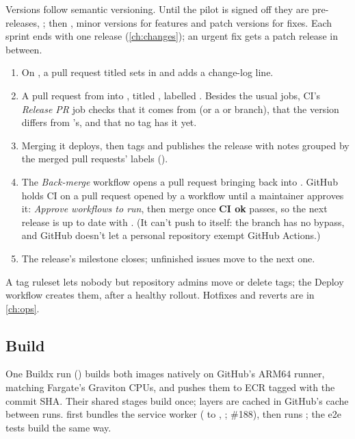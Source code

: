 Versions follow semantic versioning. Until the pilot is signed off they are pre-releases,
; then , minor versions for features and patch versions for
fixes. Each sprint ends with one release (\cref{ch:changes}); an urgent fix gets a patch release
in between.
\begin{enumerate}
  \item On , a pull request titled  sets  in
     and adds a change-log line.
  \item A pull request from  into , titled , labelled
    . Besides the usual jobs, CI's \emph{Release PR} job checks that it
    comes from  (or a  or  branch), that the version differs
    from 's, and that no tag has it yet.
  \item Merging it deploys, then tags  and publishes the release with notes grouped by
    the merged pull requests' labels ().
  \item The \emph{Back-merge} workflow opens a pull request bringing  back into
    . GitHub holds CI on a pull request opened by a workflow until a maintainer
    approves it: \emph{Approve workflows to run}, then merge once \textbf{CI ok} passes, so the
    next release is up to date with . (It can't push to  itself: the
    branch has no bypass, and GitHub doesn't let a personal repository exempt GitHub Actions.)
  \item The release's milestone closes; unfinished issues move to the next one.
\end{enumerate}
A tag ruleset lets nobody but repository admins move or delete  tags; the Deploy
workflow creates them, after a healthy rollout. Hotfixes and reverts are in \cref{ch:ops}.

\subsection{Build}
One Buildx run () builds both images natively on GitHub's ARM64 runner,
matching Fargate's Graviton CPUs, and pushes them to ECR tagged with the commit SHA. Their shared
stages build once; layers are cached in GitHub's cache between runs.  first
bundles the service worker ( to , ; \#188), then
runs ; the e2e tests build the same way.

